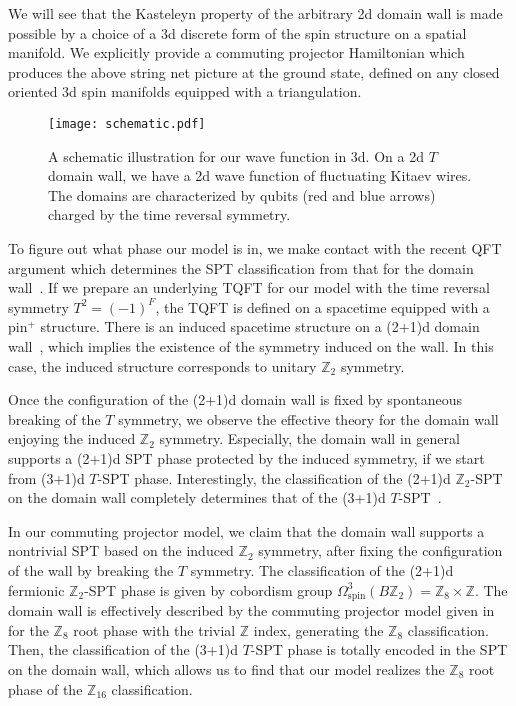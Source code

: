 \documentclass[12pt]{article}
\numberwithin{equation}{section}
\begin{document}
We will see that the Kasteleyn property of the arbitrary 2d domain wall is made possible by a choice of a 3d discrete form of the spin structure on a spatial manifold.
We explicitly provide a commuting projector Hamiltonian which produces the above string net picture at the ground state, defined on any closed oriented 3d spin manifolds equipped with a triangulation. 


\begin{figure}[htb]
\centering
\texttt{[image: schematic.pdf]}
\caption{A schematic illustration for our wave function in 3d. On a 2d $T$ domain wall, we have a 2d wave function of fluctuating Kitaev wires. The domains are characterized by qubits (red and blue arrows) charged by the time reversal symmetry.}
\label{fig:schematic}
\end{figure}

To figure out what phase our model is in, we make contact with the recent QFT argument which determines the SPT classification from that for the domain wall~\cite{HKT2019CPT, COSY2019decorated}. 
If we prepare an underlying TQFT for our model with the time reversal symmetry $T^2=(-1)^F$, the TQFT is defined on a spacetime equipped with a pin$^{+}$ structure.
There is an induced spacetime structure on a (2+1)d domain wall~\cite{Kapustin:2014dxa}, which implies the existence of the symmetry induced on the wall. In this case, the induced structure corresponds to unitary $\mathbb{Z}_2$ symmetry.

Once the configuration of the (2+1)d domain wall is fixed by spontaneous breaking of the $T$ symmetry, we observe the effective theory for the domain wall enjoying the induced $\mathbb{Z}_2$ symmetry. Especially, the domain wall in general supports a (2+1)d SPT phase protected by the induced symmetry, if we start from (3+1)d $T$-SPT phase.
Interestingly, the classification of the (2+1)d $\mathbb{Z}_2$-SPT on the domain wall completely determines that of the (3+1)d $T$-SPT~\cite{HKT2019CPT}.

In our commuting projector model, we claim that the domain wall supports a nontrivial SPT based on the induced $\mathbb{Z}_2$ symmetry, after fixing the configuration of the wall by breaking the $T$ symmetry. 
The classification of the (2+1)d fermionic $\mathbb{Z}_2$-SPT phase is given by cobordism group $\Omega_{\mathrm{spin}}^3(B\mathbb{Z}_2)=\mathbb{Z}_8\times\mathbb{Z}$. The domain wall is effectively described by the commuting projector model given in~\cite{Tarantino} for the $\mathbb{Z}_8$ root phase with the trivial $\mathbb{Z}$ index, generating the $\mathbb{Z}_8$ classification.
Then, the classification of the (3+1)d $T$-SPT phase is totally encoded in the SPT on the domain wall, which allows us to find that our model realizes the $\mathbb{Z}_8$ root phase of the $\mathbb{Z}_{16}$ classification.
\end{document}
